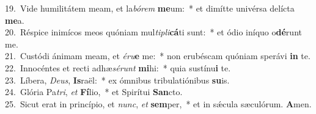 {19.~}Vide humilitátem meam, et la\textit{bó}\textit{rem} \textbf{me}um:~* et dimítte univérsa delícta \textbf{me}a.\\
{20.~}Réspice inimícos meos quóniam mul\textit{ti}\textit{pli}\textbf{cá}ti sunt:~* et ódio iníquo o\textbf{dé}runt me.\\
{21.~}Custódi ánimam meam, et \textit{é}\textit{ru}\textbf{e} me:~* non erubéscam quóniam sperávi \textbf{in} te.\\
{22.~}Innocéntes et recti adhæ\textit{sé}\textit{runt} \textbf{mi}hi:~* quia sustínu\textbf{i} te.\\
{23.~}Líbera, \textit{De}\textit{us}, \textbf{Is}raël:~* ex ómnibus tribulatiónibus \textbf{su}is.\\
{24.~}Glória Pa\textit{tri}, \textit{et} \textbf{Fí}lio,~* et Spirítui \textbf{San}cto.\\
{25.~}Sicut erat in princípio, et \textit{nunc}, \textit{et} \textbf{sem}per,~* et in sǽcula sæculórum. \textbf{A}men.\\
